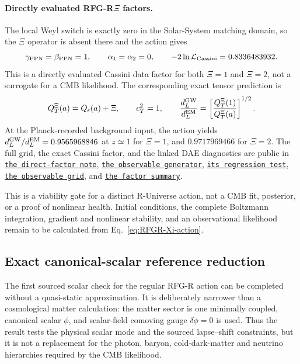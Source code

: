 \documentclass[11pt,a4paper]{article}
\newcommand{\RFGRepoURL}{https://github.com/MartinPetrasek123/MartinPetrasek123}
\newcommand{\RFGRepoNamed}[2]{\href{\RFGRepoURL/blob/main/r-universe-complete-chain/rfg-r-completion/r\_universe\_completion/#1}{\texttt{#2}}}
\begin{document}
\paragraph{Directly evaluated RFG-R\(\Xi\) factors.}
The local Weyl switch is exactly zero in the Solar-System matching domain, so
the \(\Xi\) operator is absent there and the action gives
\begin{equation}
 \gamma_{\rm PPN}=\beta_{\rm PPN}=1,\qquad
 \alpha_1=\alpha_2=0,\qquad
 -2\ln\mathcal L_{\rm Cassini}=0.8336483932 .
 \label{eq:RFGR-Xi-Cassini}
\end{equation}
This is a directly evaluated Cassini data factor for both \(\Xi=1\) and
\(\Xi=2\), not a surrogate for a CMB likelihood. The corresponding exact
tensor prediction is
\begin{equation}
 Q_T^\Xi(a)=Q_\epsilon(a)+\Xi,\qquad c_T^2=1,\qquad
 \frac{d_L^{\rm GW}}{d_L^{\rm EM}}=
 \left[\frac{Q_T^\Xi(1)}{Q_T^\Xi(a)}\right]^{1/2}.
 \label{eq:RFGR-Xi-direct-observables}
\end{equation}
At the Planck-recorded background input, the action yields
\(d_L^{\rm GW}/d_L^{\rm EM}=0.9565968846\) at \(z\simeq1\) for \(\Xi=1\),
and \(0.9717969466\) for \(\Xi=2\). The full grid, the exact Cassini factor,
and the linked DAE diagnostics are public in
\RFGRepoNamed{docs/rfg\_xi\_validated\_factors.md}{the direct-factor note},
\RFGRepoNamed{scripts/rfg\_xi\_observables.py}{the observable generator},
\RFGRepoNamed{scripts/validate\_rfg\_xi\_observables.py}{its regression test},
\RFGRepoNamed{generated/tables/rfg\_xi\_observables.csv}{the observable grid}, and
\RFGRepoNamed{generated/tables/rfg\_xi\_validated\_factors.csv}{the factor summary}.

This is a viability gate for a distinct R-Universe action, not a CMB fit,
posterior, or a proof of nonlinear health. Initial conditions, the complete
Boltzmann integration, gradient and nonlinear stability, and an observational
likelihood remain to be calculated from Eq.~\eqref{eq:RFGR-Xi-action}.

\subsection{Exact canonical-scalar reference reduction}
\label{sec:rfgr-canonical-scalar}

The first sourced scalar check for the regular RFG-R action can be completed
without a quasi-static approximation.  It is deliberately narrower than a
cosmological matter calculation: the matter sector is one minimally coupled,
canonical scalar \(\phi\), and scalar-field comoving gauge
\(\delta\phi=0\) is used.  Thus the result tests the physical scalar mode
and the sourced lapse--shift constraints, but it is not a replacement for the
photon, baryon, cold-dark-matter and neutrino hierarchies required by the CMB
likelihood.
\end{document}
